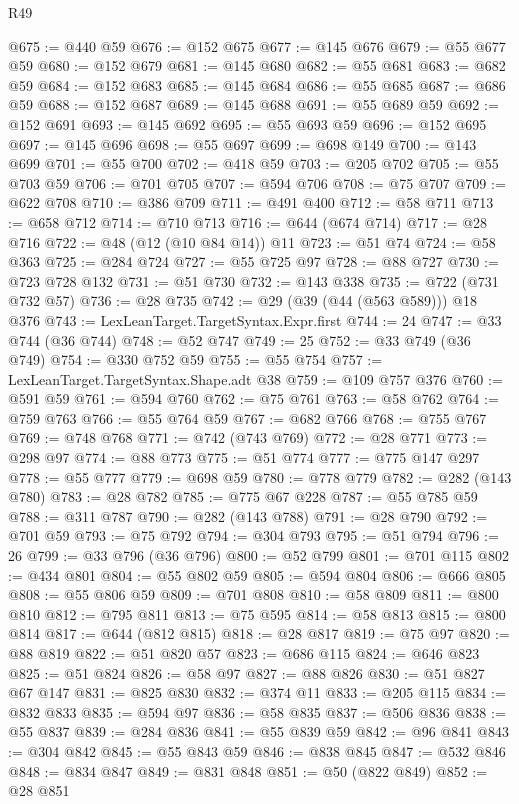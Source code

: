 \begin{lexlean}{R49}
\begin{coremodule}
@675 := @440 @59
@676 := @152 @675
@677 := @145 @676
@679 := @55 @677 @59
@680 := @152 @679
@681 := @145 @680
@682 := @55 @681
@683 := @682 @59
@684 := @152 @683
@685 := @145 @684
@686 := @55 @685
@687 := @686 @59
@688 := @152 @687
@689 := @145 @688
@691 := @55 @689 @59
@692 := @152 @691
@693 := @145 @692
@695 := @55 @693 @59
@696 := @152 @695
@697 := @145 @696
@698 := @55 @697
@699 := @698 @149
@700 := @143 @699
@701 := @55 @700
@702 := @418 @59
@703 := @205 @702
@705 := @55 @703 @59
@706 := @701 @705
@707 := @594 @706
@708 := @75 @707
@709 := @622 @708
@710 := @386 @709
@711 := @491 @400
@712 := @58 @711
@713 := @658 @712
@714 := @710 @713
@716 := @644 (@674 @714)
@717 := @28 @716
@722 := @48 (@12 (@10 @84 @14)) @11
@723 := @51 @74
@724 := @58 @363
@725 := @284 @724
@727 := @55 @725 @97
@728 := @88 @727
@730 := @723 @728 @132
@731 := @51 @730
@732 := @143 @338
@735 := @722 (@731 @732 @57)
@736 := @28 @735
@742 := @29 (@39 (@44 (@563 @589))) @18 @376
@743 := LexLeanTarget.TargetSyntax.Expr.first
@744 := 24
@747 := @33 @744 (@36 @744)
@748 := @52 @747
@749 := 25
@752 := @33 @749 (@36 @749)
@754 := @330 @752 @59
@755 := @55 @754
@757 := LexLeanTarget.TargetSyntax.Shape.adt @38
@759 := @109 @757 @376
@760 := @591 @59
@761 := @594 @760
@762 := @75 @761
@763 := @58 @762
@764 := @759 @763
@766 := @55 @764 @59
@767 := @682 @766
@768 := @755 @767
@769 := @748 @768
@771 := @742 (@743 @769)
@772 := @28 @771
@773 := @298 @97
@774 := @88 @773
@775 := @51 @774
@777 := @775 @147 @297
@778 := @55 @777
@779 := @698 @59
@780 := @778 @779
@782 := @282 (@143 @780)
@783 := @28 @782
@785 := @775 @67 @228
@787 := @55 @785 @59
@788 := @311 @787
@790 := @282 (@143 @788)
@791 := @28 @790
@792 := @701 @59
@793 := @75 @792
@794 := @304 @793
@795 := @51 @794
@796 := 26
@799 := @33 @796 (@36 @796)
@800 := @52 @799
@801 := @701 @115
@802 := @434 @801
@804 := @55 @802 @59
@805 := @594 @804
@806 := @666 @805
@808 := @55 @806 @59
@809 := @701 @808
@810 := @58 @809
@811 := @800 @810
@812 := @795 @811
@813 := @75 @595
@814 := @58 @813
@815 := @800 @814
@817 := @644 (@812 @815)
@818 := @28 @817
@819 := @75 @97
@820 := @88 @819
@822 := @51 @820 @57
@823 := @686 @115
@824 := @646 @823
@825 := @51 @824
@826 := @58 @97
@827 := @88 @826
@830 := @51 @827 @67 @147
@831 := @825 @830
@832 := @374 @11
@833 := @205 @115
@834 := @832 @833
@835 := @594 @97
@836 := @58 @835
@837 := @506 @836
@838 := @55 @837
@839 := @284 @836
@841 := @55 @839 @59
@842 := @96 @841
@843 := @304 @842
@845 := @55 @843 @59
@846 := @838 @845
@847 := @532 @846
@848 := @834 @847
@849 := @831 @848
@851 := @50 (@822 @849)
@852 := @28 @851

\end{coremodule}
\end{lexlean}
